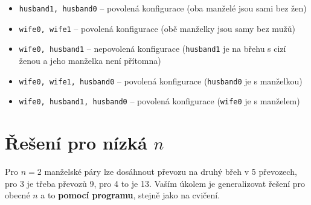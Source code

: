 \documentclass{article}
\begin{document}
	\begin{itemize}
		\item \texttt{husband1, husband0} – povolená konfigurace (oba manželé jsou sami bez žen)
		\item \texttt{wife0, wife1} – povolená konfigurace (obě manželky jsou samy bez mužů)
		\item \texttt{wife0, husband1} – nepovolená konfigurace (\texttt{husband1} je na břehu s cizí ženou a jeho manželka není přítomna)
		\item \texttt{wife0, wife1, husband0} – povolená konfigurace (\texttt{husband0} je s manželkou)
		\item \texttt{wife0, husband1, husband0} – povolená konfigurace (\texttt{wife0} je s manželem)
	\end{itemize}
	
	\section*{Řešení pro nízká $n$}
	
	Pro $n=2$ manželské páry lze dosáhnout převozu na druhý břeh v 5 převozech, pro 3 je třeba převozů 9, pro 4 to je 13.
	Vaším úkolem je generalizovat řešení pro obecné $n$ a to \textbf{pomocí programu}, stejně jako na cvičení.
	
	
\end{document}
